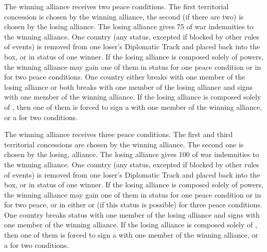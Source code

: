 The winning alliance receives two peace conditions.
 The first territorial concession is chosen by
the winning alliance, the second (if there are two) is chosen by the losing
alliance.
\bparag[Indemnities] The losing alliance gives 75 \ducats of war indemnities
to the winning alliance.
 One country (any status, excepted if blocked
by other rules of events) is removed from one loser's Diplomatic Track and
placed back into the \Neutral box, or in \MR status of one winner. If the
losing alliance is composed solely of \MIN powers, the winning alliance may
gain one of them in \MR status for one peace condition or in \AM for two peace
conditions.
 One \ROTW country either breaks \dipAT with
one member of the losing alliance or both breaks \dipFR with one member of the
losing alliance and signs \dipFR with one member of the winning alliance. If the
losing alliance is composed solely of \MIN, then one of them is forced to sign
a \dipFR with one member of the winning alliance, or a \dipAT for two conditions.

 The winning alliance receives three peace
conditions.
 The first and third territorial concessions
are chosen by the winning alliance. The second one is chosen by the losing,
alliance.
\bparag[Indemnities] The losing alliance gives 100 \ducats of war indemnities
to the winning alliance.
 One country (any status, excepted if blocked
by other rules of events) is removed from one loser's Diplomatic Track and
placed back into the \Neutral box, or in \MR status of one winner. If the
losing alliance is composed solely of \MIN powers, the winning alliance may
gain one of them in \MR status for one peace condition or in \AM for two
peace, or in either \EG or \VASSAL (if this status is possible) for three
peace conditions.
 One \ROTW country breaks status with one
member of the losing alliance and signs \dipFR with one member of the winning
alliance. If the losing alliance is composed solely of \MIN, then one of them
is forced to sign a \dipFR with one member of the winning alliance, or a
\dipAT for two conditions.

